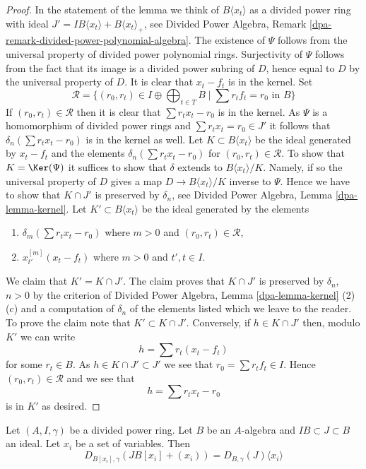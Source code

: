 \begin{proof}
In the statement of the lemma we think of $B\langle x_t \rangle$
as a divided power ring with ideal
$J' = IB\langle x_t \rangle + B\langle x_t \rangle_{+}$, see
Divided Power Algebra, Remark \ref{dpa-remark-divided-power-polynomial-algebra}.
The existence of $\Psi$ follows from the universal property of
divided power polynomial rings. Surjectivity of $\Psi$ follows from
the fact that its image is a divided power subring of $D$, hence equal to $D$
by the universal property of $D$. It is clear that
$x_t - f_t$ is in the kernel. Set
$$
\mathcal{R} = \{(r_0, r_t) \in I \oplus \bigoplus\nolimits_{t \in T} B
\mid \sum r_t f_t = r_0 \text{ in }B\}
$$
If $(r_0, r_t) \in \mathcal{R}$ then it is clear that
$\sum r_t x_t - r_0$ is in the kernel.
As $\Psi$ is a homomorphism of divided power rings
and $\sum r_tx_t = r_0 \in J'$
it follows that $\delta_n(\sum r_t x_t - r_0)$ is in the kernel as well.
Let $K \subset B\langle x_t \rangle$ be the ideal generated by
$x_t - f_t$ and the elements $\delta_n(\sum r_t x_t - r_0)$ for
$(r_0, r_t) \in \mathcal{R}$.
To show that $K = \Ker(\Psi)$ it suffices to show that
$\delta$ extends to $B\langle x_t \rangle/K$. Namely, if so the universal
property of $D$ gives a map $D \to B\langle x_t \rangle/K$
inverse to $\Psi$. Hence we have to show that $K \cap J'$ is
preserved by $\delta_n$, see
Divided Power Algebra, Lemma \ref{dpa-lemma-kernel}.
Let $K' \subset B\langle x_t \rangle$ be the ideal
generated by the elements
\begin{enumerate}
\item $\delta_m(\sum r_t x_t - r_0)$ where $m > 0$ and
$(r_0, r_t) \in \mathcal{R}$,
\item $x_{t'}^{[m]}(x_t - f_t)$ where $m > 0$ and $t', t \in I$.
\end{enumerate}
We claim that $K' = K \cap J'$. The claim proves that $K \cap J'$
is preserved by $\delta_n$, $n > 0$ by the criterion of
Divided Power Algebra, Lemma \ref{dpa-lemma-kernel} (2)(c)
and a computation of $\delta_n$
of the elements listed which we leave to the reader.
To prove the claim note that $K' \subset K \cap J'$.
Conversely, if $h \in K \cap J'$ then, modulo $K'$ we can write
$$
h = \sum r_t (x_t - f_t)
$$
for some $r_t \in B$. As $h \in K \cap J' \subset J'$
we see that $r_0 = \sum r_t f_t \in I$. Hence $(r_0, r_t) \in \mathcal{R}$
and we see that
$$
h = \sum r_t x_t - r_0
$$
is in $K'$ as desired.
\end{proof}

\begin{lemma}
\label{lemma-divided-power-envelope-add-variables}
Let $(A, I, \gamma)$ be a divided power ring.
Let $B$ be an $A$-algebra and $IB \subset J \subset B$ an ideal.
Let $x_i$ be a set of variables. Then
$$
D_{B[x_i], \gamma}(JB[x_i] + (x_i)) = D_{B, \gamma}(J) \langle x_i \rangle
$$
\end{lemma}

